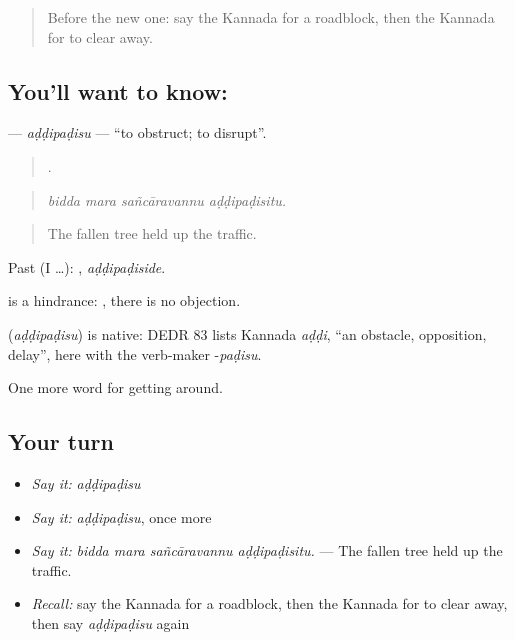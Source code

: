 \label{lesson:KA-C447-addipadisu}



\begin{quote}
Before the new one: say the Kannada for a roadblock, then the Kannada for to clear away.
\end{quote}

\subsection*{You'll want to know: }
\textbf{} — \emph{aḍḍipaḍisu} — \textquotedblleft{}to obstruct; to disrupt\textquotedblright{}.

\begin{quote}
   .
\end{quote}

\begin{quote}
\emph{bidda mara sañcāravannu aḍḍipaḍisitu.}
\end{quote}

\begin{quote}
The fallen tree held up the traffic.
\end{quote}

Past (I …): , \emph{aḍḍipaḍiside}.

 is a hindrance:  , there is no objection.

\begin{cousinweb}
\textbf{} (\emph{aḍḍipaḍisu}) is native: DEDR 83 lists Kannada \emph{aḍḍi}, \textquotedblleft{}an obstacle, opposition, delay\textquotedblright{}, here with the verb-maker -\emph{paḍisu}.
\end{cousinweb}

\begin{grammarlens}[title={What you've built}]
One more word for getting around.
\end{grammarlens}

\subsection*{Your turn}
\begin{itemize}
\raggedright
  \item \emph{Say it:} \emph{aḍḍipaḍisu}
  \item \emph{Say it:} \emph{aḍḍipaḍisu}, once more
  \item \emph{Say it:} \emph{bidda mara sañcāravannu aḍḍipaḍisitu.} — The fallen tree held up the traffic.
  \item \emph{Recall:} say the Kannada for a roadblock, then the Kannada for to clear away, then say \emph{aḍḍipaḍisu} again
\end{itemize}


